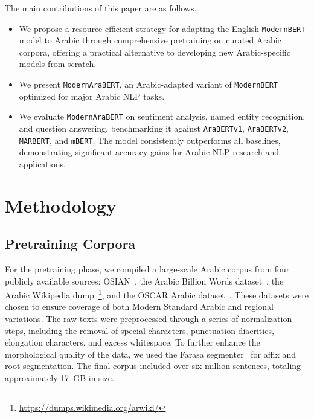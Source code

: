 \documentclass[11pt]{article}
\begin{document}
  

The main contributions of this paper are as follows.
\begin{itemize}
  \item We propose a resource-efficient strategy for adapting the English \texttt{ModernBERT} model to Arabic through comprehensive pretraining on curated Arabic corpora, offering a practical alternative to developing new Arabic-specific models from scratch.
  
  \item We present \texttt{ModernAraBERT}, an Arabic-adapted variant of \texttt{ModernBERT} optimized for major Arabic NLP tasks.
  
  \item We evaluate \texttt{ModernAraBERT} on sentiment analysis, named entity recognition, and question answering, benchmarking it against \texttt{AraBERTv1}, \texttt{AraBERTv2}, \texttt{MARBERT}, and \texttt{mBERT}. The model consistently outperforms all baselines, demonstrating significant accuracy gains for Arabic NLP research and applications.
\end{itemize}


  \section{Methodology}

  \subsection{Pretraining Corpora}
  For the pretraining phase, we compiled a large-scale Arabic corpus from four publicly available sources: OSIAN~\cite{zeroual-etal-2019-osian}, the Arabic Billion Words dataset~\cite{el20161}, the Arabic Wikipedia dump~\footnote{\href{https://dumps.wikimedia.org/arwiki/}{https://dumps.wikimedia.org/arwiki/}}, and the OSCAR Arabic dataset~\cite{2022arXiv220106642A}. These datasets were chosen to ensure coverage of both Modern Standard Arabic and regional variations. The raw texts were preprocessed through a series of normalization steps, including the removal of special characters, punctuation diacritics, elongation characters, and excess whitespace. To further enhance the morphological quality of the data, we used the Farasa segmenter~\cite{abdelali2016farasa} for affix and root segmentation. The final corpus included over six million sentences, totaling approximately 17~GB in size.
\end{document}
